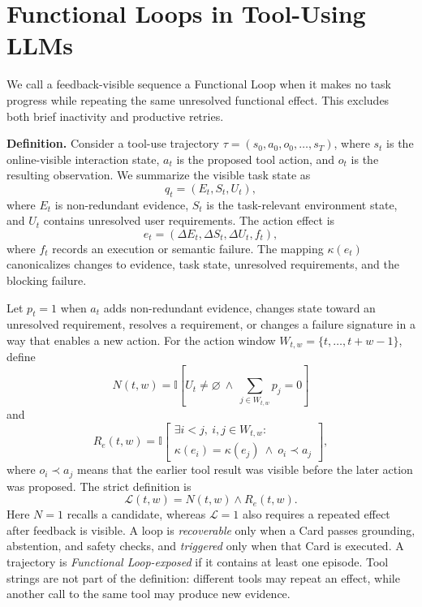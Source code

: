 \section{Functional Loops in Tool-Using LLMs}
\label{sec:functional-loops}

We call a feedback-visible sequence a Functional Loop when it makes no task
progress while repeating the same unresolved functional effect. This excludes
both brief inactivity and productive retries.

\textbf{Definition.} Consider a tool-use trajectory
$\tau=(s_0,a_0,o_0,\ldots,s_T)$, where $s_t$ is the online-visible interaction
state, $a_t$ is the proposed tool action, and $o_t$ is the resulting observation.
We summarize the visible task state as
\begin{equation}
q_t=(E_t,S_t,U_t),
\end{equation}
where $E_t$ is non-redundant evidence, $S_t$ is the task-relevant environment
state, and $U_t$ contains unresolved user requirements. The action effect is
\begin{equation}
e_t=(\Delta E_t,\Delta S_t,\Delta U_t,f_t),
\end{equation}
where $f_t$ records an execution or semantic failure. The mapping
$\kappa(e_t)$ canonicalizes changes to evidence, task state, unresolved
requirements, and the blocking failure.

Let $p_t=1$ when $a_t$ adds non-redundant evidence, changes state toward an
unresolved requirement, resolves a requirement, or changes a failure signature
in a way that enables a new action. For the action window
$W_{t,w}=\{t,\ldots,t+w-1\}$, define
\begin{equation}
N(t,w)=\mathbb{I}\!\left[U_t\neq\varnothing\ \land\
\sum_{j\in W_{t,w}}p_j=0\right]
\end{equation}
and
\begin{equation}
R_e(t,w)=\mathbb{I}\!\left[
\substack{\exists i<j,\ i,j\in W_{t,w}:\\
\kappa(e_i)=\kappa(e_j)\ \land\ o_i\prec a_j}
\right],
\end{equation}
where $o_i\prec a_j$ means that the earlier tool result was visible before the
later action was proposed. The strict definition is
\begin{equation}
\mathcal{L}(t,w)=N(t,w)\land R_e(t,w).
\label{eq:functional-loop}
\end{equation}
Here $N=1$ recalls a candidate, whereas $\mathcal{L}=1$ also requires a repeated
effect after feedback is visible. A loop is \emph{recoverable} only when a
Card passes grounding, abstention, and safety checks, and \emph{triggered} only
when that Card is executed. A trajectory is \emph{Functional Loop-exposed} if
it contains at least one episode. Tool strings are not part of the definition:
different tools may repeat an effect, while another call to the same tool may
produce new evidence.

